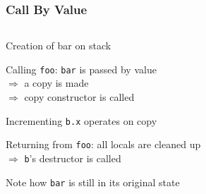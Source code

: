 \begin{frame}
  \frametitle{Call By Value}
  \begin{center}
    \begin{columns}
      \column{6cm}
      \column{6cm}
    \end{columns}
  \end{center}
  \vskip2mm
  \begin{overprint}
    \begin{center}
      Creation of bar on stack
    \end{center}

    \begin{center}
      Calling {\tt foo}: {\tt bar} is passed by value \\
      $\Rightarrow$ a copy is made \\
      $\Rightarrow$ copy constructor is called
    \end{center}

    \begin{center}
      Incrementing {\tt b.x} operates on copy
    \end{center}

    \begin{center}
      Returning from {\tt foo}: all locals are cleaned up \\
      $\Rightarrow$ {\tt b}'s destructor is called \\
    \end{center}

    \begin{center}
      Note how {\tt bar} is still in its original state
    \end{center}
  \end{overprint}
\end{frame}


